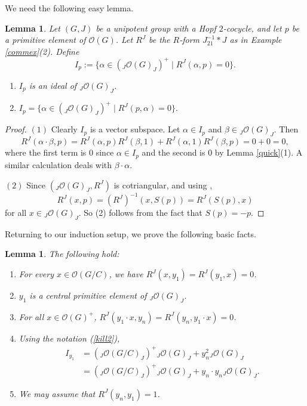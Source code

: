 \documentclass{amsart}
\numberwithin{equation}{section}
\newtheorem{lemma}[theorem]{Lemma}
\theoremstyle{definition}
\begin{document}
We need the following easy lemma.
 
\begin{lemma}\label{kernel2} Let $(G,J)$ be a unipotent group with a Hopf $2$-cocycle, and let $p$ be a primitive element of $\mathcal{O}(G)$. Let $R^J $ be the $R$-form $J_{21}^{-1}\ast J$ as in Example \ref{commex}(2). Define
\begin{equation}\label{kill2} I_p:=\{ \alpha \in (_J\mathcal{O}(G)_J)^+\mid  R^J(\alpha, p) = 0\}. 
\end{equation}
\begin{enumerate}
\item 
$I_p$ is an ideal of ${}_J\mathcal{O}(G)_J$.
\item $I_p=\{ \alpha \in (_J\mathcal{O}(G)_J)^+ \mid R^J(p, \alpha) = 0\}.$
\end{enumerate}
\end{lemma}
 
\begin{proof}$(1)$ Clearly $I_p$ is a vector subspace. Let $\alpha \in I_p$ and $\beta \in {}_J\mathcal{O}(G)_J$. Then
$$ R^J(\alpha \cdot \beta, p) = R^J(\alpha, p)R^J(\beta,1) + R^J(\alpha,1)R^J(\beta,p) = 0 + 0 = 0,$$
where the first term is $0$ since $\alpha \in I_p$ and the second is $0$ by Lemma \ref{quick}(1). A similar calculation deals with $\beta \cdot \alpha$.

$(2)$ Since $({}_J\mathcal{O}(G)_J, R^J)$ is cotriangular, and using \cite[Lemma 2.2.2]{Ma1}, 
$$ R^J(x,p)=(R^J)^{-1}(x,S(p))= R^J(S(p),x)$$
for all $x \in {}_J\mathcal{O}(G)_J$. So (2) follows from the fact that $S(p) = -p$.
\end{proof}

Returning to our induction setup, we prove the following basic facts.

\begin{lemma}\label{supportai2}
The following hold:
\begin{enumerate}
\item
For every $x\in\mathcal{O}(G/C)$, we have 
$R^J(x,y_{1})= R^J (y_1,x) = 0$.
\item
$y_1$ is a central primitive element of ${}_J\mathcal{O}(G)_{J}$.
\item
For all $x\in\mathcal{O}(G)^+$, $R^J(y_{1}\cdot x,y_{n})=R^J(y_n, y_1 \cdot x) = 0$.
\item
Using the notation (\ref{kill2}),
\begin{align*} I_{y_{1}}  &= ({}_J\mathcal{O}(G/C)_J)^+{}_J\mathcal{O}(G)_J + y_n^2 {}_J\mathcal{O}(G)_J\\
&= ({}_J\mathcal{O}(G/C)_J)^+{}_J\mathcal{O}(G)_J + y_n\cdot y_n {}_J\mathcal{O}(G)_J.
\end{align*}
\item
We may assume that $R^J(y_{n}, y_{1})=1$.
\end{enumerate}
\end{lemma}
\end{document}
